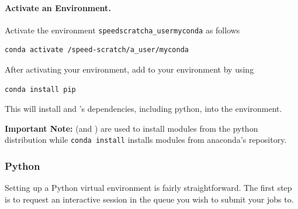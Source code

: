 \documentclass{easychair}
\begin{document}
\paragraph{Activate an Environment.}

Activate the environment \texttt{\/speed\-scratch\/a\_user\/myconda} as follows
\begin{verbatim}
conda activate /speed-scratch/a_user/myconda
\end{verbatim}
After activating your environment, add  to your environment by using 
\begin{verbatim}
conda install pip
\end{verbatim}
This will install  and 's dependencies, including python, 
into the environment.


\noindent
\textbf{Important Note:}  (and ) are used to install modules
from the python distribution while \texttt{conda install} installs modules from 
anaconda's repository.

\subsubsection{Python}
\label{sect:python-venv}

Setting up a Python virtual environment is fairly straightforward.
The first step is to request an interactive session in the queue you wish to submit your jobs to.
\end{document}
